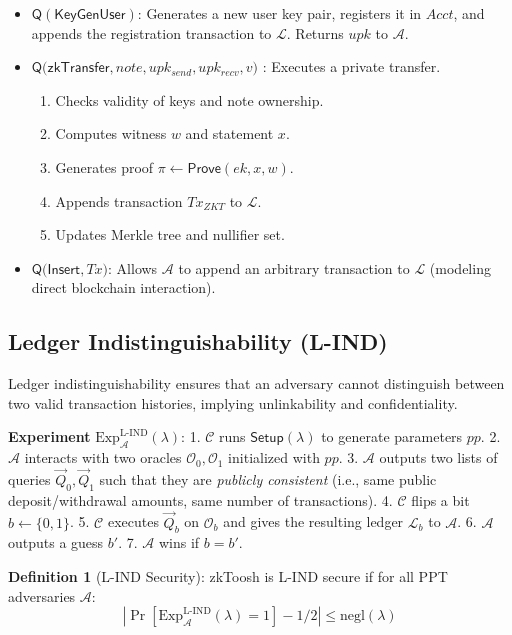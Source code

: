 \documentclass[conference]{IEEEtran}
\begin{document}
\begin{itemize}
    \item $\mathsf{Q(KeyGenUser)}$: Generates a new user key pair, registers it in $Acct$, and appends the registration transaction to $\mathcal{L}$. Returns $upk$ to $\mathcal{A}$.
    \item $\mathsf{Q(zkTransfer}, note, upk_{send}, upk_{recv}, v)$ : Executes a private transfer.
    \begin{enumerate}
        \item Checks validity of keys and note ownership.
        \item Computes witness $w$ and statement $x$.
        \item Generates proof $\pi \leftarrow \mathsf{Prove}(ek, x, w)$.
        \item Appends transaction $Tx_{ZKT}$ to $\mathcal{L}$.
        \item Updates Merkle tree and nullifier set.
    \end{enumerate}
    \item $\mathsf{Q(Insert}, Tx)$: Allows $\mathcal{A}$ to append an arbitrary transaction to $\mathcal{L}$ (modeling direct blockchain interaction).
\end{itemize}

\subsection{Ledger Indistinguishability (L-IND)}

Ledger indistinguishability ensures that an adversary cannot distinguish between two valid transaction histories, implying unlinkability and confidentiality.

\textbf{Experiment} $\text{Exp}^{\text{L-IND}}_{\mathcal{A}}(\lambda)$:
1. $\mathcal{C}$ runs $\mathsf{Setup}(\lambda)$ to generate parameters $pp$.
2. $\mathcal{A}$ interacts with two oracles $\mathcal{O}_0, \mathcal{O}_1$ initialized with $pp$.
3. $\mathcal{A}$ outputs two lists of queries $\vec{Q}_0, \vec{Q}_1$ such that they are \textit{publicly consistent} (i.e., same public deposit/withdrawal amounts, same number of transactions).
4. $\mathcal{C}$ flips a bit $b \leftarrow \{0, 1\}$.
5. $\mathcal{C}$ executes $\vec{Q}_b$ on $\mathcal{O}_b$ and gives the resulting ledger $\mathcal{L}_b$ to $\mathcal{A}$.
6. $\mathcal{A}$ outputs a guess $b'$.
7. $\mathcal{A}$ wins if $b = b'$.

\textbf{Definition 1} (L-IND Security): zkToosh is L-IND secure if for all PPT adversaries $\mathcal{A}$:
\begin{equation}
|\Pr[\text{Exp}^{\text{L-IND}}_{\mathcal{A}}(\lambda) = 1] - 1/2| \leq \text{negl}(\lambda)
\end{equation}
\end{document}
